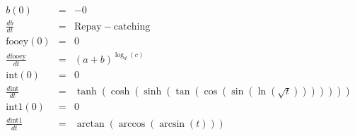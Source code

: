 \documentclass{article}
\begin{document}
\begin{eqnarray*}
b(0)&=&-0\\
\frac{ d b}{dt} &=&\mathrm{Repay}-\mathrm{catching}\\
\mathrm{fooey}(0)&=&0\\
\frac{ d \mathrm{fooey}}{dt} &=&\left(a+b\right)^{\log_{d}\left(c\right)}\\
\mathrm{int}(0)&=&0\\
\frac{ d \mathrm{int}}{dt} &=&\tanh\left(\cosh\left(\sinh\left(\tan\left(\cos\left(\sin\left(\ln\left(\sqrt{ t }\right)\right)\right)\right)\right)\right)\right)\\
\mathrm{int1}(0)&=&0\\
\frac{ d \mathrm{int1}}{dt} &=&\arctan\left(\arccos\left(\arcsin\left( t \right)\right)\right)\\
\end{eqnarray*}
\end{document}
